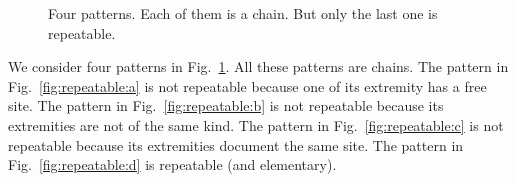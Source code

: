 \documentclass{entcs}
\begin{document}
\begin{figure}[t]
%
%

%
\caption{Four patterns. Each of them is a chain. But only the last one is repeatable.}
\label{fig:repeatable}
\end{figure}

\begin{exmp}
  We consider four patterns in Fig.~\ref{fig:repeatable}. All these patterns are chains. The pattern in Fig.~\ref{fig:repeatable:a} is not repeatable because one of its extremity has a free site. The pattern in Fig.~\ref{fig:repeatable:b} is not repeatable because its extremities are not of the same kind. The pattern in Fig.~\ref{fig:repeatable:c} is not repeatable because its extremities document the same site. The pattern in Fig.~\ref{fig:repeatable:d} is repeatable (and elementary).
\end{exmp}
\end{document}
